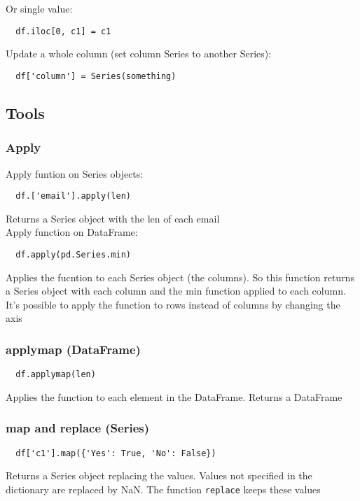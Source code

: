 \documentclass[french]{article}
\begin{document}
Or single value:
\begin{verbatim}
  df.iloc[0, c1] = c1
\end{verbatim}

Update a whole column (set column Series to another Series):
\begin{verbatim}
  df['column'] = Series(something)
\end{verbatim}

\subsection{Tools}
\subsubsection{Apply}

Apply funtion on Series objects:
\begin{verbatim}
  df.['email'].apply(len)
\end{verbatim}
Returns a Series object with the len of each email\\

Apply function on DataFrame:
\begin{verbatim}
  df.apply(pd.Series.min)
\end{verbatim}
Applies the fucntion to each Series object (the columns). So this function returns a Series object with each column and the min function applied to each column.\\

It's possible to apply the function to rows instead of columns by changing the axis

\subsubsection{applymap (DataFrame)}
\begin{verbatim}
  df.applymap(len)
\end{verbatim}

Applies the function to each element in the DataFrame. Returns a DataFrame

\subsubsection{map and replace (Series)}
\begin{verbatim}
  df['c1'].map({'Yes': True, 'No': False})
\end{verbatim}
Returns a Series object replacing the values. Values not specified in the dictionary are replaced by NaN. The function \verb|replace| keeps these values
\end{document}
